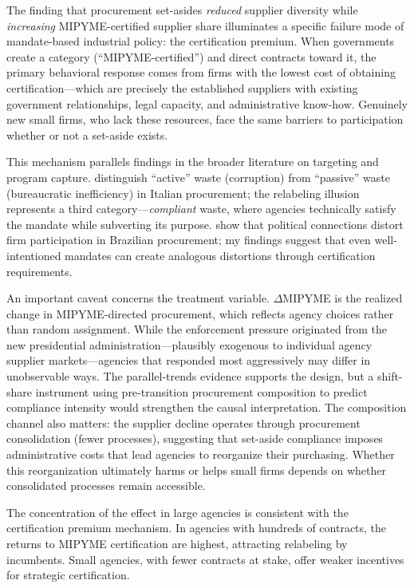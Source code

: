 \documentclass[12pt]{article}
\begin{document}
The finding that procurement set-asides \textit{reduced} supplier diversity while \textit{increasing} MIPYME-certified supplier share illuminates a specific failure mode of mandate-based industrial policy: the certification premium. When governments create a category (``MIPYME-certified'') and direct contracts toward it, the primary behavioral response comes from firms with the lowest cost of obtaining certification---which are precisely the established suppliers with existing government relationships, legal capacity, and administrative know-how. Genuinely new small firms, who lack these resources, face the same barriers to participation whether or not a set-aside exists.

This mechanism parallels findings in the broader literature on targeting and program capture. \citet{bandiera2009active} distinguish ``active'' waste (corruption) from ``passive'' waste (bureaucratic inefficiency) in Italian procurement; the relabeling illusion represents a third category---\textit{compliant} waste, where agencies technically satisfy the mandate while subverting its purpose. \citet{colonnelli2020corruption} show that political connections distort firm participation in Brazilian procurement; my findings suggest that even well-intentioned mandates can create analogous distortions through certification requirements.

An important caveat concerns the treatment variable. $\Delta$MIPYME is the realized change in MIPYME-directed procurement, which reflects agency choices rather than random assignment. While the enforcement pressure originated from the new presidential administration---plausibly exogenous to individual agency supplier markets---agencies that responded most aggressively may differ in unobservable ways. The parallel-trends evidence supports the design, but a shift-share instrument using pre-transition procurement composition to predict compliance intensity would strengthen the causal interpretation. The composition channel also matters: the supplier decline operates through procurement consolidation (fewer processes), suggesting that set-aside compliance imposes administrative costs that lead agencies to reorganize their purchasing. Whether this reorganization ultimately harms or helps small firms depends on whether consolidated processes remain accessible.

The concentration of the effect in large agencies is consistent with the certification premium mechanism. In agencies with hundreds of contracts, the returns to MIPYME certification are highest, attracting relabeling by incumbents. Small agencies, with fewer contracts at stake, offer weaker incentives for strategic certification.
\end{document}

